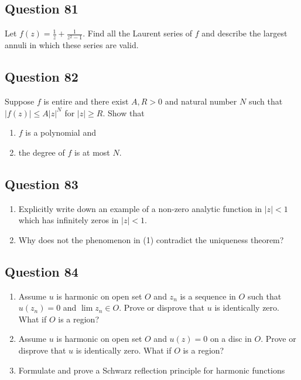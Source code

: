 \documentclass[12pt]{article}
\begin{document}
\hypertarget{question-81-2}{%
\subsection{Question 81}\label{question-81-2}}

Let \(\displaystyle f(z) = \frac{1}{z} + \frac{1}{z^2 -1}\). Find all
the Laurent series of \(f\) and describe the largest annuli in which
these series are valid.

\hypertarget{question-82-2}{%
\subsection{Question 82}\label{question-82-2}}

Suppose \(f\) is entire and there exist \(A, R >0\) and natural number
\(N\) such that \(|f(z)| \leq A |z|^N\) for \(|z| \geq R\). Show that

\begin{enumerate}
\def\labelenumi{(\roman{enumi})}
\item
  \(f\) is a polynomial and
\item
  the degree of \(f\) is at most \(N\).
\end{enumerate}

\hypertarget{question-83-2}{%
\subsection{Question 83}\label{question-83-2}}

\begin{enumerate}
\def\labelenumi{(\arabic{enumi})}
\item
  Explicitly write down an example of a non-zero analytic function in
  \(|z|<1\) which has infinitely zeros in \(|z|<1\).
\item
  Why does not the phenomenon in (1) contradict the uniqueness theorem?
\end{enumerate}

\hypertarget{question-84-2}{%
\subsection{Question 84}\label{question-84-2}}

\begin{enumerate}
\def\labelenumi{(\arabic{enumi})}
\item
  Assume \(u\) is harmonic on open set \(O\) and \(z_n\) is a sequence
  in \(O\) such that \(u(z_n) = 0\) and \(\lim z_n \in O\). Prove or
  disprove that \(u\) is identically zero. What if \(O\) is a region?
\item
  Assume \(u\) is harmonic on open set \(O\) and \(u(z) = 0\) on a disc
  in \(O\). Prove or disprove that \(u\) is identically zero. What if
  \(O\) is a region?
\item
  Formulate and prove a Schwarz reflection principle for harmonic
  functions
\end{enumerate}
\end{document}
